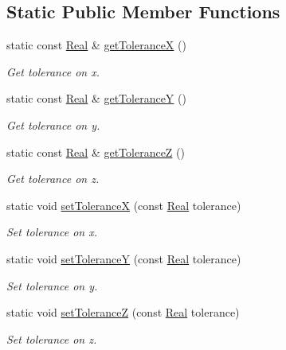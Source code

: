 \subsection*{Static Public Member Functions}
\begin{DoxyCompactItemize}
\item 
static const \hyperlink{namespaceFVCode3D_a40c1f5588a248569d80aa5f867080e83}{Real} \& \hyperlink{classFVCode3D_1_1Point3D_ada9a4f80fd2549bc60c703d315f11d23}{get\+ToleranceX} ()
\begin{DoxyCompactList}\small\item\em Get tolerance on x. \end{DoxyCompactList}\item 
static const \hyperlink{namespaceFVCode3D_a40c1f5588a248569d80aa5f867080e83}{Real} \& \hyperlink{classFVCode3D_1_1Point3D_a1215124223c3c61359e9e41ca4d383d8}{get\+ToleranceY} ()
\begin{DoxyCompactList}\small\item\em Get tolerance on y. \end{DoxyCompactList}\item 
static const \hyperlink{namespaceFVCode3D_a40c1f5588a248569d80aa5f867080e83}{Real} \& \hyperlink{classFVCode3D_1_1Point3D_a14cccea4d030ed38a5ae3b7bfc415113}{get\+ToleranceZ} ()
\begin{DoxyCompactList}\small\item\em Get tolerance on z. \end{DoxyCompactList}\item 
static void \hyperlink{classFVCode3D_1_1Point3D_ac0a8b34122ec9539270198e638e1bdf8}{set\+ToleranceX} (const \hyperlink{namespaceFVCode3D_a40c1f5588a248569d80aa5f867080e83}{Real} tolerance)
\begin{DoxyCompactList}\small\item\em Set tolerance on x. \end{DoxyCompactList}\item 
static void \hyperlink{classFVCode3D_1_1Point3D_a95a65422250722b77f60246d469995a1}{set\+ToleranceY} (const \hyperlink{namespaceFVCode3D_a40c1f5588a248569d80aa5f867080e83}{Real} tolerance)
\begin{DoxyCompactList}\small\item\em Set tolerance on y. \end{DoxyCompactList}\item 
static void \hyperlink{classFVCode3D_1_1Point3D_a4df5eee86f2f40aaf068647f27dfbb6e}{set\+ToleranceZ} (const \hyperlink{namespaceFVCode3D_a40c1f5588a248569d80aa5f867080e83}{Real} tolerance)
\begin{DoxyCompactList}\small\item\em Set tolerance on z. \end{DoxyCompactList}\end{DoxyCompactItemize}
